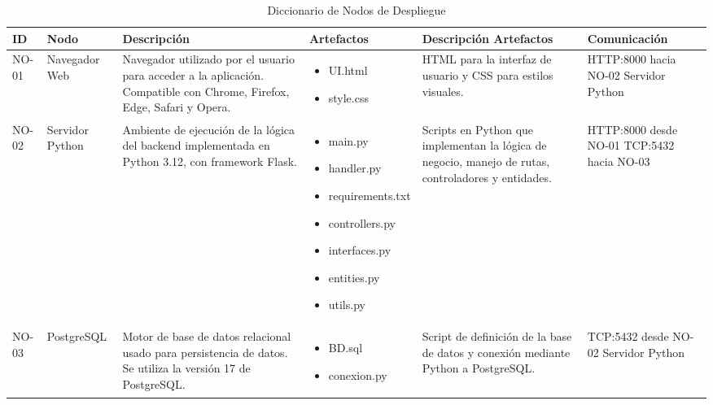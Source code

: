 \begin{table}[H]
\centering
\caption{Diccionario de Nodos de Despliegue}
\label{tab:diccionario_nodos_despliegue}
\begin{tabular}{|p{1cm}|p{2cm}|p{3.5cm}|p{3cm}|p{3cm}|p{3cm}|}
\hline
\textbf{ID} & \textbf{Nodo} & \textbf{Descripción} & \textbf{Artefactos} & \textbf{Descripción Artefactos} & \textbf{Comunicación} \\ \hline

NO-01 & Navegador Web & Navegador utilizado por el usuario para acceder a la aplicación. Compatible con Chrome, Firefox, Edge, Safari y Opera. & 
\begin{itemize}[leftmargin=*, noitemsep]
    \item UI.html
    \item style.css
\end{itemize} & 
HTML para la interfaz de usuario y CSS para estilos visuales. & 
HTTP:8000 hacia NO-02 Servidor Python \\ \hline

NO-02 & Servidor Python & Ambiente de ejecución de la lógica del backend implementada en Python 3.12, con framework Flask. & 
\begin{itemize}[leftmargin=*, noitemsep]
    \item main.py
    \item handler.py
    \item requirements.txt
    \item controllers.py
    \item interfaces.py
    \item entities.py
    \item utils.py
\end{itemize} & 
Scripts en Python que implementan la lógica de negocio, manejo de rutas, controladores y entidades. & 
HTTP:8000 desde NO-01 \newline TCP:5432 hacia NO-03 \\ \hline

NO-03 & PostgreSQL & Motor de base de datos relacional usado para persistencia de datos. Se utiliza la versión 17 de PostgreSQL. & 
\begin{itemize}[leftmargin=*, noitemsep]
    \item BD.sql
    \item conexion.py
\end{itemize} & 
Script de definición de la base de datos y conexión mediante Python a PostgreSQL. & 
TCP:5432 desde NO-02 Servidor Python \\ \hline

\end{tabular}
\end{table}

